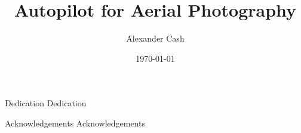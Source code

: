 \documentclass{uoyths}
\begin{document}
\begin{titlepage}[cover=true, title=true, logo=true] 
\title{Autopilot for Aerial Photography}
\author{Alexander Cash}
\date{\today}
\end{titlepage}

\begin{frontMatterEnv}

\begin{chapterEnv}{Dedication}
Dedication
\end{chapterEnv}

\begin{chapterEnv}{Acknowledgements}
Acknowledgements
\end{chapterEnv}



{\singlespacing\tableofcontents}%

\listoffigures

\listoftables

\end{frontMatterEnv}


\begin{mainMatterEnv}











\end{mainMatterEnv}

\begin{backMatterEnv}


\printglossaries











% 




\end{backMatterEnv}
\end{document}
